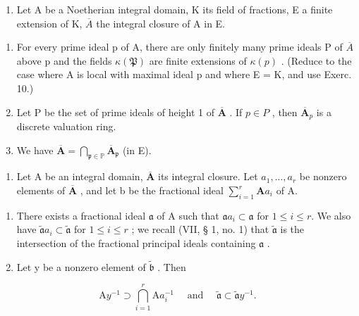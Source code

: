\begin{enumerate}
\def\labelenumi{\arabic{enumi})}
\setcounter{enumi}{10}
\tightlist
\item
  Let A be a Noetherian integral domain, K its field of fractions, E a finite extension of K, \(\overline{A}\) the integral closure of A in E.
\end{enumerate}

\begin{enumerate}
\def\labelenumi{\alph{enumi})}
\item
  For every prime ideal p of A, there are only finitely many prime ideals P of \(\overline{A}\) above p and the fields \(\kappa(\mathfrak{P})\) are finite extensions of \(\kappa(p)\) . (Reduce to the case where A is local with maximal ideal p and where E = K, and use Exerc. 10.)
\item
  Let P be the set of prime ideals of height 1 of \(\overline{\mathbf{A}}\) . If \(p \in P\) , then \(\overline{\mathbf{A}}_p\) is a discrete valuation ring.
\item
  We have \(\overline{\mathbf{A}} = \bigcap_{\mathfrak{p} \in \mathbb{P}} \overline{\mathbf{A}}_{\mathfrak{p}}\) (in E).
\end{enumerate}

\begin{enumerate}
\def\labelenumi{\arabic{enumi})}
\setcounter{enumi}{11}
\tightlist
\item
  Let A be an integral domain, \(\overline{\mathbf{A}}\) its integral closure. Let \(a_1, \ldots, a_r\) be nonzero elements of \(\overline{\mathbf{A}}\) , and let b be the fractional ideal \(\sum_{i=1}^{r} \mathbf{A}a_i\) of A.
\end{enumerate}

\begin{enumerate}
\def\labelenumi{\alph{enumi})}
\item
  There exists a fractional ideal \(\mathfrak{a}\) of A such that \(\mathfrak{a}a_{i} \subset \mathfrak{a}\) for \(1 \leqslant i \leqslant r\). We also have \(\tilde{\mathfrak{a}}a_{i} \subset \tilde{\mathfrak{a}}\) for \(1 \leqslant i \leqslant r\) ; we recall (VII, § 1, no. 1) that \(\tilde{\mathfrak{a}}\) is the intersection of the fractional principal ideals containing \(\mathfrak{a}\) .
\item
  Let y be a nonzero element of \(\tilde{\mathfrak{b}}\) . Then
\end{enumerate}

\[
\mathrm{A} y ^ {- 1} \supset \bigcap_ {i = 1} ^ {r} \mathrm{A} a _ {i} ^ {- 1} \quad \text { and } \quad \widetilde {\mathfrak {a}} \subset \widetilde {\mathfrak {a}} y ^ {- 1}.
\]

